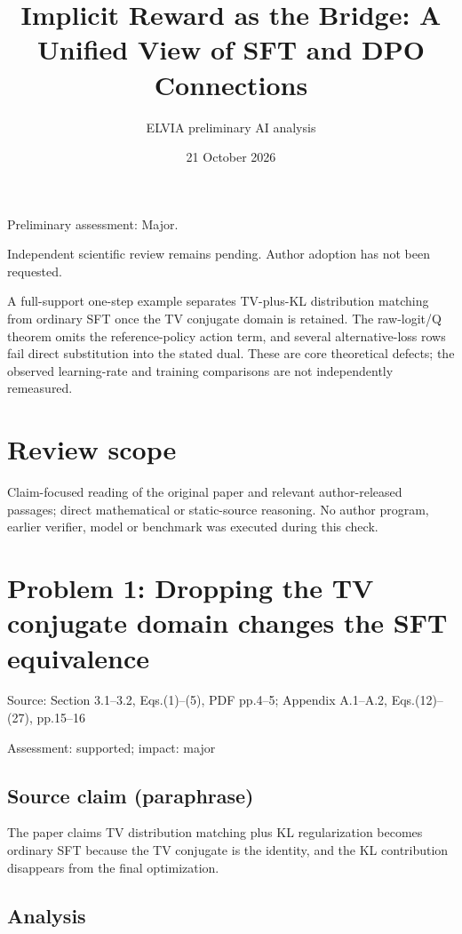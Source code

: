 \documentclass[11pt]{article}
\begin{document}
\title{Implicit Reward as the Bridge: A Unified View of SFT and DPO Connections}

\author{ELVIA preliminary AI analysis}\date{21 October 2026}\maketitle

Preliminary assessment: Major.\par

Independent scientific review remains pending. Author adoption has not been requested.

A full-support one-step example separates TV-plus-KL distribution matching from ordinary SFT once the TV conjugate domain is retained. The raw-logit/Q theorem omits the reference-policy action term, and several alternative-loss rows fail direct substitution into the stated dual. These are core theoretical defects; the observed learning-rate and training comparisons are not independently remeasured.

\section*{Review scope}

Claim-focused reading of the original paper and relevant author-released passages; direct mathematical or static-source reasoning. No author program, earlier verifier, model or benchmark was executed during this check.

\section*{Problem 1: Dropping the TV conjugate domain changes the SFT equivalence}

Source: Section 3.1–3.2, Eqs.(1)–(5), PDF pp.4–5; Appendix A.1–A.2, Eqs.(12)–(27), pp.15–16

Assessment: supported; impact: major

\subsection*{Source claim (paraphrase)}

The paper claims TV distribution matching plus KL regularization becomes ordinary SFT because the TV conjugate is the identity, and the KL contribution disappears from the final optimization.

\subsection*{Analysis}
\end{document}
